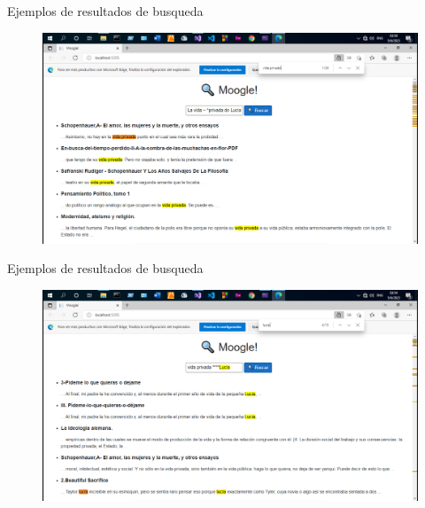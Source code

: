 \begin{frame}{Ejemplos de resultados de busqueda}
        \begin{figure}
                \includegraphics[width=0.9\framewidth]{../Informe/fotos/13 - Resultados (6).png}
        \end{figure}
\end{frame}

\begin{frame}{Ejemplos de resultados de busqueda}
        \begin{figure}
                \includegraphics[width=0.9\framewidth]{../Informe/fotos/14 - Resultados (7).png}
        \end{figure}
\end{frame}